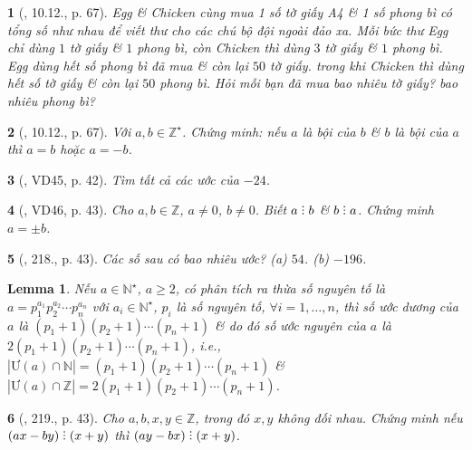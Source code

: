 \documentclass{article}
\newtheorem{baitoan}{}
\newtheorem{lemma}{Lemma}
\DeclareRobustCommand{\divby}{%
	\mathrel{\vbox{\baselineskip.65ex\lineskiplimit0pt\hbox{.}\hbox{.}\hbox{.}}}%
}
\begin{document}
\begin{baitoan}[\cite{Binh_boi_duong_Toan_6_tap_1}, 10.12., p. 67]
	Egg \& Chicken cùng mua 1 số tờ giấy A4 \& 1 số phong bì có tổng số như nhau để viết thư cho các chú bộ đội ngoài đảo xa. Mỗi bức thư Egg chỉ dùng $1$ tờ giấy \& $1$ phong bì, còn Chicken thì dùng $3$ tờ giấy \& $1$ phong bì. Egg dùng hết số phong bì đã mua \& còn lại $50$ tờ giấy. trong khi Chicken thì dùng hết số tờ giấy \& còn lại $50$ phong bì. Hỏi mỗi bạn đã mua bao nhiêu tờ giấy? bao nhiêu phong bì?
\end{baitoan}

\begin{baitoan}[\cite{Binh_boi_duong_Toan_6_tap_1}, 10.12., p. 67]
	Với $a,b\in\mathbb{Z}^\star$. Chứng minh: nếu $a$ là bội của $b$ \& $b$ là bội của $a$ thì $a = b$ hoặc $a = -b$.
\end{baitoan}

\begin{baitoan}[\cite{Tuyen_Toan_6}, VD45, p. 42]
	Tìm tất cả các ước của $-24$.
\end{baitoan}

\begin{baitoan}[\cite{Tuyen_Toan_6}, VD46, p. 43]
	Cho $a,b\in\mathbb{Z}$, $a\ne0$, $b\ne0$. Biết $a\divby b$ \& $b\divby a$. Chứng minh $a = \pm b$.
\end{baitoan}

\begin{baitoan}[\cite{Tuyen_Toan_6}, 218., p. 43]
	Các số sau có bao nhiêu ước? (a) $54$. (b) $-196$.
\end{baitoan}

\begin{lemma}
	\label{lemma: number of divisor}
	Nếu $a\in\mathbb{N}^\star$, $a\ge2$, có phân tích ra thừa số nguyên tố là $a = p_1^{a_1}p_2^{a_2}\cdots p_n^{a_n}$ với $a_i\in\mathbb{N}^\star$, $p_i$ là số nguyên tố, $\forall i = 1,\ldots,n$, thì số ước dương của $a$ là $(p_1 + 1)(p_2 + 1)\cdots(p_n + 1)$ \& do đó số ước nguyên của $a$ là $2(p_1 + 1)(p_2 + 1)\cdots(p_n + 1)$, i.e., $|\mbox{Ư}(a)\cap\mathbb{N}| = (p_1 + 1)(p_2 + 1)\cdots(p_n + 1)$ \& $|\mbox{Ư}(a)\cap\mathbb{Z}| = 2(p_1 + 1)(p_2 + 1)\cdots(p_n + 1)$.
\end{lemma}

\begin{baitoan}[\cite{Tuyen_Toan_6}, 219., p. 43]
	Cho $a,b,x,y\in\mathbb{Z}$, trong đó $x,y$ không đối nhau. Chứng minh nếu $(ax - by)\divby(x + y)$  thì $(ay - bx)\divby(x + y)$.
\end{baitoan}
\end{document}
